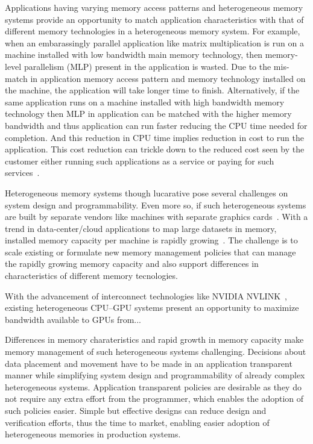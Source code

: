 Applications having varying memory access patterns and heterogeneous memory
systems provide an opportunity to match application characteristics with that of
different memory technologies in a heterogeneous memory system. For example,
when an embarassingly parallel application like matrix multiplication is run on
a machine installed with low bandwidth main memory technology, then memory-level
parallelism (MLP) present in the application is wasted. Due to the mis-match in
application memory access pattern and memory technology installed on the
machine, the application will take longer time to finish. Alternatively, if the
same application runs on a machine installed with high bandwidth memory
technology then MLP in application can be matched with the higher memory
bandwidth and thus application can run faster reducing the CPU time needed for
completion. And this reduction in CPU time implies reduction in cost to run the
application.  This cost reduction can trickle down to the reduced cost seen by
the customer either running such applications as a service or paying for such
services~\cite{AWS-pricing-model}.

Heterogeneous memory systems though lucarative pose several challenges on system
design and programmability. Even more so, if such heterogeneous systems are built by
separate vendors like machines with separate graphics cards~\cite{XXXXX}. With a
trend in data-center/cloud applications to map large datasets in memory,
installed memory capacity per machine is rapidly growing~\cite{Spark}. The
challenge is to scale existing or formulate new memory management policies that
can manage the rapidly growing memory capacity and also support differences in
characteristics of different memory tecnologies.

With the advancement of interconnect technologies like NVIDIA
NVLINK~\cite{}, existing heterogeneous CPU--GPU systems present an opportunity
to maximize bandwidth available to GPUs from...

Differences in memory charateristics and rapid growth in memory capacity make
memory management of such heterogeneous systems challenging. Decisions about
data placement and movement have to be made in an application transparent manner
while simplifying system design and programmability of already complex
heterogeneous systems. Application transparent policies are desirable as they do
not require any extra effort from the programmer, which enables the adoption of
such policies easier. Simple but effective designs can reduce design and
verification efforts, thus the time to market, enabling easier adoption of
heterogeneous memories in production systems.

